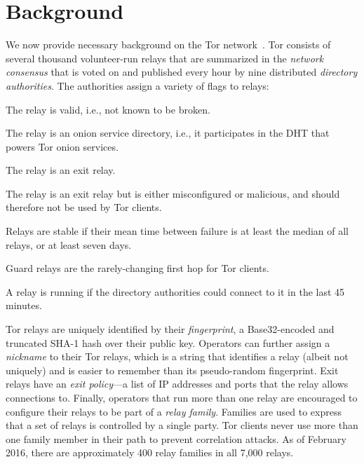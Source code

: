 \section{Background}
\label{sec:background}
We now provide necessary background on the Tor network~\cite{Dingledine2004a}.
Tor consists of several thousand volunteer-run relays that are summarized in the
\emph{network consensus} that is voted on and published every hour by nine
distributed \emph{directory authorities}.  The authorities assign a variety of
flags to relays:

\begin{description}[noitemsep]
	\item[Valid:] The relay is valid, i.e., not known to be broken.
	\item[HSDir:] The relay is an onion service directory, i.e., it participates
		in the DHT that powers Tor onion services.
	\item[Exit:] The relay is an exit relay.
	\item[BadExit:] The relay is an exit relay but is either misconfigured or
		malicious, and should therefore not be used by Tor clients.
	\item[Stable:] Relays are stable if their mean time between failure is at
		least the median of all relays, or at least seven days.
	\item[Guard:] Guard relays are the rarely-changing first hop for Tor clients.
	\item[Running:] A relay is running if the directory authorities could
		connect to it in the last 45 minutes.
\end{description}

Tor relays are uniquely identified by their \emph{fingerprint}, a Base32-encoded
and truncated SHA-1 hash over their public key.  Operators can further assign a
\emph{nickname} to their Tor relays, which is a string that identifies a relay
(albeit not uniquely) and is easier to remember than its pseudo-random
fingerprint.  Exit relays have an \emph{exit policy}---a list of IP addresses
and ports that the relay allows connections to.  Finally, operators that run
more than one relay are encouraged to configure their relays to be part of a
\emph{relay family}.  Families are used to express that a set of relays is
controlled by a single party.  Tor clients never use more than one family member
in their path to prevent correlation attacks.  As of February 2016, there are
approximately 400 relay families in all 7,000 relays.
